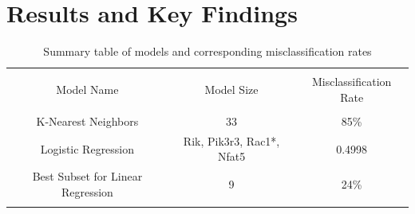 \documentclass{article}
\begin{document}
\section{Results and Key Findings}
\begin{table}[!htbp] \centering 
	\caption{Summary table of models and corresponding misclassification rates} 
	\label{table:results} 
	\begin{tabular}{ccc} 
		\\[-1.8ex]\hline 
		\hline \\[-1.8ex] 
		Model Name & Model Size & Misclassification Rate \\ 
		\hline \\[-1.8ex] 
		K-Nearest Neighbors & 33 & 85\% \\ 
		Logistic Regression & Rik, Pik3r3, Rac1*, Nfat5 & 0.4998 \\ 
		Best Subset for Linear Regression& 9 & 24\% \\ 
		\hline \\[-1.8ex] 
	\end{tabular} 
\end{table} 
\end{document}
